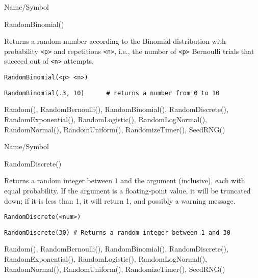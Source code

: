 \begin{desc}{Name/Symbol}
\item[Name/Symbol]	RandomBinomial()

\item[Description]	Returns a random number according to the Binomial distribution 
		with probability \verb+<p>+ and repetitions \verb+<n>+, i.e., the number of 
		\verb+<p>+ Bernoulli trials that succeed out of \verb+<n>+ attempts.

\item[Usage]		
\begin{verbatim}
RandomBinomial(<p> <n>)  
\end{verbatim}

\item[Example]	
\begin{verbatim}
RandomBinomial(.3, 10)		# returns a number from 0 to 10
\end{verbatim}

\item[See Also]	Random(), RandomBernoulli(), RandomBinomial(),
		RandomDiscrete(), RandomExponential(), RandomLogistic(),
		RandomLogNormal(), RandomNormal(), RandomUniform(),    
		RandomizeTimer(), SeedRNG()    
\end{desc}

\rl


\begin{desc}{Name/Symbol}
\item[Name/Symbol]	RandomDiscrete()

\item[Description]	Returns a random integer between 1 and the argument 
		(inclusive), each with equal probability.  If the argument is 
		a floating-point value, it will be truncated down; if it is 
		less than 1, it will return 1, and possibly a warning message. 

\item[Usage]		
\begin{verbatim}
RandomDiscrete(<num>)
\end{verbatim}
         
\item[Example]	
\begin{verbatim}
RandomDiscrete(30) # Returns a random integer between 1 and 30
\end{verbatim}

\item[See Also]	Random(), RandomBernoulli(), RandomBinomial(), 
		RandomDiscrete(), RandomExponential(), RandomLogistic(),
		RandomLogNormal(), RandomNormal(), RandomUniform(),
		RandomizeTimer(), SeedRNG()    
\end{desc}

